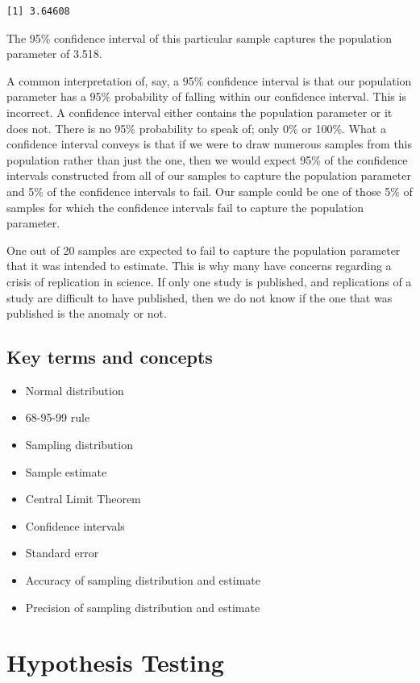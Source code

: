 \documentclass[
]{book}
\providecommand{\tightlist}{%
  \setlength{\itemsep}{0pt}\setlength{\parskip}{0pt}}
\begin{document}
\begin{verbatim}
[1] 3.64608
\end{verbatim}

The 95\% confidence interval of this particular sample captures the population parameter of 3.518.

A common interpretation of, say, a 95\% confidence interval is that our population parameter has a 95\% probability of falling within our confidence interval. This is incorrect. A confidence interval either contains the population parameter or it does not. There is no 95\% probability to speak of; only 0\% or 100\%. What a confidence interval conveys is that if we were to draw numerous samples from this population rather than just the one, then we would expect 95\% of the confidence intervals constructed from all of our samples to capture the population parameter and 5\% of the confidence intervals to fail. Our sample could be one of those 5\% of samples for which the confidence intervals fail to capture the population parameter.

One out of 20 samples are expected to fail to capture the population parameter that it was intended to estimate. This is why many have concerns regarding a crisis of replication in science. If only one study is published, and replications of a study are difficult to have published, then we do not know if the one that was published is the anomaly or not.

\hypertarget{kt10}{%
\section{Key terms and concepts}\label{kt10}}

\begin{itemize}
\tightlist
\item
  Normal distribution
\item
  68-95-99 rule
\item
  Sampling distribution
\item
  Sample estimate
\item
  Central Limit Theorem
\item
  Confidence intervals
\item
  Standard error
\item
  Accuracy of sampling distribution and estimate
\item
  Precision of sampling distribution and estimate
\end{itemize}

\hypertarget{hypothesis-testing}{%
\chapter{Hypothesis Testing}\label{hypothesis-testing}}
\end{document}

